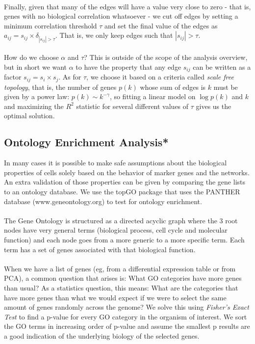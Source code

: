\\
Finally, given that many of the edges will have a value very close to zero - that is, genes with no biological correlation whatsoever - we cut off edges by setting a minimum correlation threshold $\tau$ and set the final value of the edges as $a_{ij} = s_{ij} \times \delta_{|s_{ij}| > \tau}$. That is, we only keep edges such that $|s_{ij}| > \tau$. \\
\\
How do we choose $\alpha$ and $\tau$? This is outside of the scope of the analysis overview, but in short we want $\alpha$ to have the property that any edge $s_{ij}$ can be written as a factor $s_{ij} = s_i \times s_j$. As for $\tau$, we choose it based on a criteria called \emph{scale free topology}, that is, the number of genes $p(k)$ whose sum of edges is $k$ must be given by a power law: $p(k) \sim k^{-\gamma}$, so fitting a linear model on $\log p(k)$ and $k$ and maximizing the $R^2$ statistic for several different values of $\tau$ gives us the optimal solution.

\newpage
\subsection{Ontology Enrichment Analysis*}

In many cases it is possible to make safe assumptions about the biological properties of cells solely based on the behavior of marker genes and the networks. An extra validation of those properties can be given by comparing the gene lists to an ontology database. We use the topGO package \cite{alexa2010topgo} that uses the PANTHER database (www.geneontology.org) to test for ontology enrichment. \\
\\
The Gene Ontology is structured as a directed acyclic graph where the 3 root nodes have very general terms (biological process, cell cycle and molecular function) and each node goes from a more generic to a more specific term. Each term has a set of genes associated with that biological function. \\
\\
When we have a list of genes (eg, from a differential expression table or from PCA), a common question that arises is: What GO categories have more genes than usual? As a statistics question, this means: What are the categories that have more genes than what we would expect if we were to select the same amount of genes randomly across the genome? We solve this using \emph{Fisher's Exact Test} to find a p-value for every GO category in the organism of interest. We sort the GO terms in increasing order of p-value and assume the smallest p results are a good indication of the underlying biology of the selected genes.

